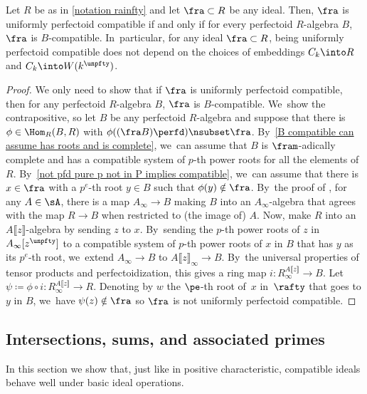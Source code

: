 \begin{proposition}\label{uniformly perfd compatible does not depend on choice of embedding}
Let $R$ be as in \autoref{notation rainfty} and let $\fra\subset R$ be any ideal. Then, $\fra$ is uniformly perfectoid compatible if and only if for every perfectoid $R$\nobreakdash-algebra $B$, $\fra$ is $B$-compatible. In~particular, for any ideal $\fra\subset R$, being uniformly perfectoid compatible does not depend on the choices of embeddings $C_k\into R$ and $C_k\into W(k^\unpfty)$.
\end{proposition}

\begin{proof}
We only need to show that if $\fra$ is uniformly perfectoid compatible, then for any perfectoid $R$\nobreakdash-algebra $B$, $\fra$ is $B$-compatible. We~show the contrapositive, so let $B$ be any perfectoid $R$\nobreakdash-algebra and suppose that there is $\phi\in \Hom_R(B,R)$ with $\phi( (\fra B)\perfd)\nsubset \fra$. By~\autoref{B compatible can assume has roots and is complete}, we~can assume that $B$ is $\fram$-adically complete and has a compatible system of $p$-th power roots for all the elements of $R$. By~\autoref{not pfd pure p not in P implies compatible}, we~can assume that there is $x\in \fra$ with a $p^e$-th root $y\in B$ such that $\phi(y)\notin\fra$. By~the proof of \cite[Lem.\,4.23]{BMPSTWWPerfectoidPure}, for any $A\in \sA$, there is a map $A_\infty\to B$ making $B$ into an $A_\infty$-algebra that agrees with the map $R\to B$ when restricted to (the image of) $A$. Now, make $R$ into an $A\llbracket z\rrbracket$-algebra by sending $z$ to $x$. By~sending the $p$-th power roots of $z$ in $A_\infty [ z^{\unpfty} ]$ to a compatible system of $p$-th power roots of $x$ in $B$ that has $y$ as its $p^e$-th root, we~extend $A_\infty\to B$ to $A\llbracket z \rrbracket_\infty \to B$. By~the universal properties of tensor products and perfectoidization, this gives a ring map $i\colon R^{A\llbracket z \rrbracket}_\infty \to B$. Let $\psi\coloneqq \phi\circ i\colon R^{A\llbracket z \rrbracket}_\infty\to R$. Denoting by $w$ the $\pe$-th root of~$x$ in~$\rafty$ that goes to $y$ in $B$, we~have $\psi(z)\notin \fra$ so $\fra$ is not uniformly perfectoid compatible.
\end{proof}

\subsection{Intersections, sums, and associated primes} In this section we show that, just like in positive characteristic, compatible ideals behave well under basic ideal operations.

